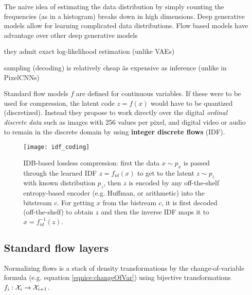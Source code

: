 The naive idea of estimating the data distribution by simply counting the frequencies (as in a histogram) breaks down in high dimensions. 
Deep generative models allow for learning complicated data distributions.
Flow based models have advantage over other deep generative models
\begin{compactitem}
\item they admit exact log-likelihood estimation (unlike VAEs)
\item sampling (decoding) is relatively cheap \~ as expensive as inference (unlike in PixelCNNs)
\end{compactitem}

Standard flow models $f$ are defined for continuous variables. If these were to be used for compression, the latent code $z = f(x)$ would have to be quantized (discretized).
Instead they propose to work directly over the digital \emph{ordinal discrete data} such as images with 256 values per pixel, and digital video or audio to remain in the discrete domain by using \textbf{integer discrete flows} (IDF).

\begin{figure}[ht]
\texttt{[image: idf\_coding]}
\centering
\caption{IDB-based lossless compression: first the data $x \sim p_x$ is passed through the learned IDF $z = f_{id}(x)$ to get to the latent $z \sim p_z$ with known distribution $p_z$, then $z$ is encoded by any off-the-shelf entropy-based encoder (e.g. Huffman, or arithmetic) into the bitstream $c$. For getting $x$ from the bistream $c$, it is first decoded (off-the-shelf) to obtain $z$ and then the inverse IDF maps it to $x = f_{id}^{-1}(z)$.}
\end{figure}

\subsection{Standard flow layers}

Normalizing flows is a stack of density transformations by the change-of-variable formula (e.g. equation \eqref{eqnice:changeOfVar}) using bijective transformations $f_i: \mathcal{X}_{i} \to \mathcal{X}_{i+1}$.

